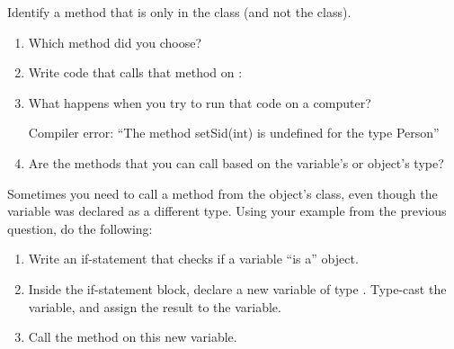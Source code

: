 \vspace{-2em}


\Q Identify a method that is only in the  class (and not the  class).

\setlength{\defaultwidth}{15em}

\begin{enumerate}
\item Which method did you choose? 

\item Write code that calls that method on :

\item What happens when you try to run that code on a computer?
\begin{answer}[2em]
Compiler error: ``The method setSid(int) is undefined for the type Person''
\end{answer}

\item Are the methods that you can call based on the variable's or object's type?
\hfill {}
\end{enumerate}


\Q Sometimes you need to call a method from the object's class, even though the variable was declared as a different type.
Using your example from the previous question, do the following:

\begin{enumerate}
\item Write an if-statement that checks if a  variable ``is a''  object.
\begin{answer}[1em]
\end{answer}

\item Inside the if-statement block, declare a new variable of type .
Type-cast the  variable, and assign the result to the   variable.

\begin{answer}[1em]
\end{answer}

\item Call the  method on this new variable.

\begin{answer}[1em]
\end{answer}
\end{enumerate}


